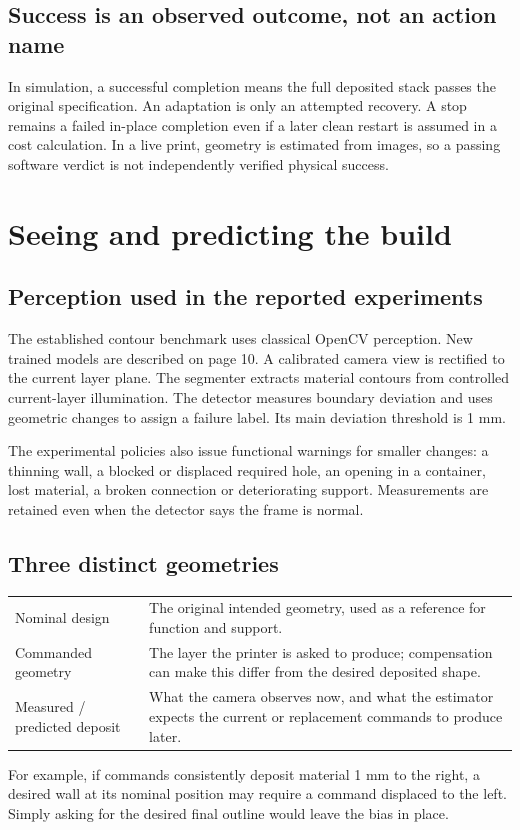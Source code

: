 \documentclass[10pt,letterpaper]{article}
\newcommand{\nextpage}{\clearpage}
\begin{document}
\subsection*{Success is an observed outcome, not an action name}
In simulation, a successful completion means the full deposited stack passes the
original specification. An adaptation is only an attempted recovery. A stop
remains a failed in-place completion even if a later clean restart is assumed in
a cost calculation. In a live print, geometry is estimated from images, so a
passing software verdict is not independently verified physical success.

\nextpage
\section{Seeing and predicting the build}

\subsection*{Perception used in the reported experiments}
The established contour benchmark uses classical OpenCV perception. New trained
models are described on page 10. A calibrated camera view is rectified to the current layer plane. The
segmenter extracts material contours from controlled current-layer illumination.
The detector measures boundary deviation and uses geometric changes to assign a
failure label. Its main deviation threshold is 1 mm.

The experimental policies also issue functional warnings for smaller changes:
a thinning wall, a blocked or displaced required hole, an opening in a container,
lost material, a broken connection or deteriorating support. Measurements are
retained even when the detector says the frame is normal.

\subsection*{Three distinct geometries}
\begin{tabularx}{\linewidth}{@{}p{1.55in}Y@{}}
\toprule
Nominal design & The original intended geometry, used as a reference for function and support.\\
Commanded geometry & The layer the printer is asked to produce; compensation can make this differ from the desired deposited shape.\\
Measured / predicted deposit & What the camera observes now, and what the estimator expects the current or replacement commands to produce later.\\
\bottomrule
\end{tabularx}
For example, if commands consistently deposit material 1 mm to the right, a
desired wall at its nominal position may require a command displaced to the
left. Simply asking for the desired final outline would leave the bias in place.
\end{document}
